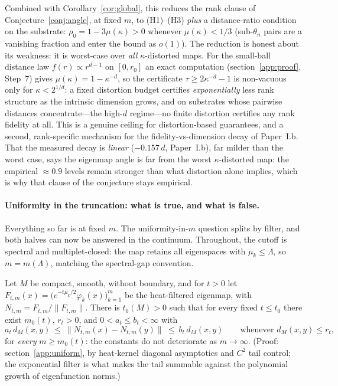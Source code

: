 \documentclass[review]{siamart220329}
\begin{document}
Combined with Corollary~\ref{cor:global}, this reduces the rank clause of
Conjecture~\ref{conj:angle}, at fixed $m$, to (H1)--(H3) \emph{plus} a
distance-ratio condition on the substrate: $\rho_0=1-3\mu(\kappa)>0$ whenever
$\mu(\kappa)<1/3$ (sub-$\theta_n$ pairs are a vanishing fraction and enter the
bound as $o(1)$). The reduction is honest about its weakness: it is worst-case
over \emph{all} $\kappa$-distorted maps. For the small-ball distance law
$f(r)\propto r^{d-1}$ on $[0,r_0]$ an exact computation
(section~\ref{app:proof}, Step~7) gives $\mu(\kappa)=1-\kappa^{-d}$, so the
certificate $\tau\ge2\kappa^{-d}-1$ is non-vacuous only for $\kappa<2^{1/d}$:
a fixed distortion budget certifies \emph{exponentially} less rank structure
as the intrinsic dimension grows, and on substrates whose pairwise distances
concentrate---the high-$d$ regime---no finite distortion certifies any rank
fidelity at all. This is a genuine ceiling for distortion-based guarantees,
and a second, rank-specific mechanism for the fidelity-vs-dimension decay of
Paper~I.b. That the measured decay is \emph{linear} ($-0.157\,d$,
Paper~I.b), far milder than the worst case, says the eigenmap angle is
far from the worst $\kappa$-distorted map: the empirical $\approx0.9$ levels
remain stronger than what distortion alone implies, which is why that clause
of the conjecture stays empirical.

\paragraph{Uniformity in the truncation: what is true, and what is false.}
Everything so far is at fixed $m$. The uniformity-in-$m$ question splits by
filter, and both halves can now be answered in the continuum. Throughout, the
cutoff is spectral and multiplet-closed: the map retains all eigenspaces with
$\mu_k\le\Lambda$, so $m=m(\Lambda)$, matching the spectral-gap convention.

\begin{theorem}\label{thm:heat}
Let $M$ be compact, smooth, without boundary, and for $t>0$ let
$F_{t,m}(x)=\big(e^{-t\mu_k/2}\varphi_k(x)\big)_{k=1}^{m}$ be the heat-filtered
eigenmap, with $N_{t,m}=F_{t,m}/\lVert F_{t,m}\rVert$. There is $t_0(M)>0$ such
that for every fixed $t\le t_0$ there exist $m_0(t)$, $r_t>0$, and
$0<a_t\le b_t<\infty$ with
\[
a_t\,d_M(x,y)\ \le\ \lVert N_{t,m}(x)-N_{t,m}(y)\rVert\ \le\ b_t\,d_M(x,y)
\qquad\text{whenever }d_M(x,y)\le r_t,
\]
for \emph{every} $m\ge m_0(t)$: the constants do not deteriorate as
$m\to\infty$. (Proof: section~\ref{app:uniform}, by heat-kernel diagonal
asymptotics and $C^2$ tail control; the exponential filter is what makes the
tail summable against the polynomial growth of eigenfunction norms.)
\end{theorem}
\end{document}
